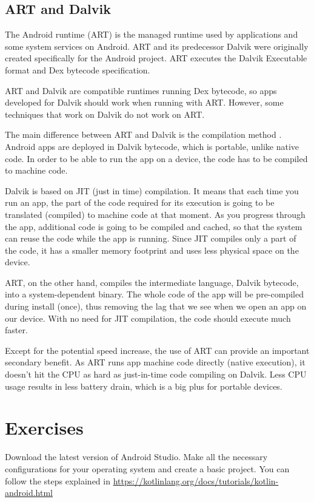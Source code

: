 \subsection{ART and Dalvik}
The Android runtime (ART) \cite{Android2019} is the managed runtime used by applications and some system services on Android.
ART and its predecessor Dalvik were originally created specifically for the Android project.
ART executes the Dalvik Executable format and Dex bytecode specification.

ART and Dalvik are compatible runtimes running Dex bytecode, so apps developed for Dalvik should work when running with ART.
However, some techniques that work on Dalvik do not work on ART.

The main difference between ART and Dalvik is the compilation method \cite{Vitas2013}.
Android apps are deployed in Dalvik bytecode, which is portable, unlike native code.
In order to be able to run the app on a device, the code has to be compiled to machine code.

Dalvik is based on JIT (just in time) compilation.
It means that each time you run an app, the part of the code required for its execution is going to be translated (compiled) to machine code at that moment.
As you progress through the app, additional code is going to be compiled and cached, so that the system can reuse the code while the app is running.
Since JIT compiles only a part of the code, it has a smaller memory footprint and uses less physical space on the device.

ART, on the other hand, compiles the intermediate language, Dalvik bytecode, into a system-dependent binary.
The whole code of the app will be pre-compiled during install (once), thus removing the lag that we see when we open an app on our device.
With no need for JIT compilation, the code should execute much faster.

Except for the potential speed increase, the use of ART can provide an important secondary benefit.
As ART runs app machine code directly (native execution), it doesn't hit the CPU as hard as just-in-time code compiling on Dalvik.
Less CPU usage results in less battery drain, which is a big plus for portable devices.



\section{Exercises}
\begin{exercise}
	Download the latest version of Android Studio.
	Make all the necessary configurations for your operating system and create a basic project.
	You can follow the steps explained in \url{https://kotlinlang.org/docs/tutorials/kotlin-android.html}
\end{exercise}


